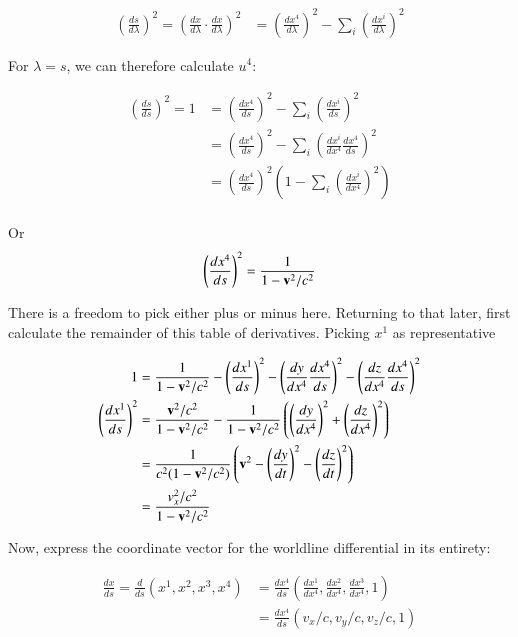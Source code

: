 \begin{align*}
\left(\frac{ds}{d\lambda}\right)^2 = \left( \frac{dx}{d\lambda} \cdot \frac{dx}{d\lambda} \right)^2
&= \left(\frac{dx^4}{d\lambda}\right)^2 - \sum_i \left(\frac{dx^i}{d\lambda}\right)^2
\end{align*}

For $\lambda = s$, we can therefore calculate $u^4$:

\begin{align*}
\left(\frac{ds}{ds}\right)^2 = 1 
&= \left(\frac{dx^4}{ds}\right)^2 - \sum_i \left(\frac{dx^i}{ds}\right)^2 \\
&= \left(\frac{dx^4}{ds}\right)^2 - \sum_i \left( \frac{dx^i}{dx^4} \frac{dx^4}{ds} \right)^2 \\
&= \left(\frac{dx^4}{ds}\right)^2 \left( 1 - \sum_i \left( \frac{dx^i}{dx^4} \right)^2 \right) \\
\end{align*}

Or
\begin{align}\label{eqn:timearc}
\left(\frac{dx^4}{ds}\right)^2 = \frac{1}{1 - \mathbf{v}^2/c^2 } \\
\end{align}

There is a freedom to pick either plus or minus here.  Returning to that later, first 
calculate the remainder of this table of derivatives.  Picking $x^1$ as representative

\begin{align*}
1 &= \frac{1}{1 - \mathbf{v}^2/c^2 } 
- \left(\frac{dx^1}{ds}\right)^2
- \left( \frac{dy}{dx^4} \frac{dx^4}{ds} \right)^2
- \left( \frac{dz}{dx^4} \frac{dx^4}{ds} \right)^2 \\
\left(\frac{dx^1}{ds}\right)^2
&= \frac{\mathbf{v}^2/c^2 }{1 - \mathbf{v}^2/c^2 } 
-\frac{1}{1 - \mathbf{v}^2/c^2 } \left( \left( \frac{dy}{dx^4} \right)^2 + \left( \frac{dz}{dx^4} \right)^2 \right) \\
&= \frac{1}{c^2 (1 - \mathbf{v}^2/c^2) } \left( \mathbf{v}^2 - \left( \frac{dy}{dt} \right)^2 - \left( \frac{dz}{dt} \right)^2 \right) \\
&= \frac{v_x^2/c^2}{1 - \mathbf{v}^2/c^2}
\end{align*}

Now, express the coordinate vector for the worldline differential in its entirety:

\begin{align*}
\frac{dx}{ds} =
\frac{d}{ds}(x^1, x^2, x^3, x^4)
&= \frac{dx^4}{ds} \left( \frac{dx^1}{dx^4}, \frac{dx^2}{dx^4}, \frac{dx^3}{dx^4}, 1 \right) \\
&= \frac{dx^4}{ds} ( v_x/c, v_y/c, v_z/c, 1) \\
\end{align*}

